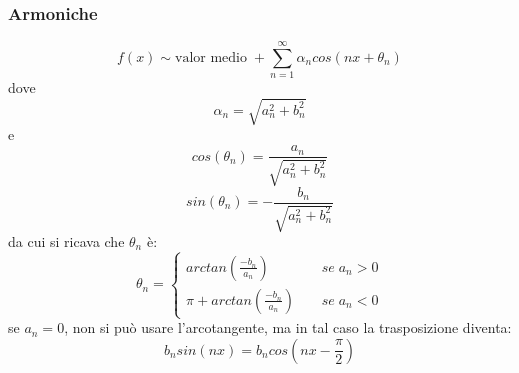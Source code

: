 \subsubsection{Armoniche}
\[
    f(x) \sim \text{valor medio}\; + \sum_{n=1}^{\infty}\alpha_n cos(nx + \theta_n)
\]
dove
\[
    \alpha_n = \sqrt{a_n^2 + b_n^2}
\]
e
\[
    cos(\theta_n) = \frac{a_n}{\sqrt{a_n^2 + b_n^2}}
\]
\[
    sin(\theta_n) = -\frac{b_n}{\sqrt{a_n^2 + b_n^2}}
\]
da cui si ricava che $\theta_n$ è:
\[
    \theta_n = \begin{cases}
        arctan\left(\frac{-b_n}{a_n}\right) \;\;\;\; &se \; a_n > 0\\
        \pi + arctan\left(\frac{-b_n}{a_n}\right) \;\;\;\;& se \; a_n < 0
    \end{cases}
\]
se $a_n = 0$, non si può usare l'arcotangente, ma in tal caso la trasposizione diventa:
\[
    b_n sin(nx) = b_n cos(nx - \frac{\pi}{2})
\]